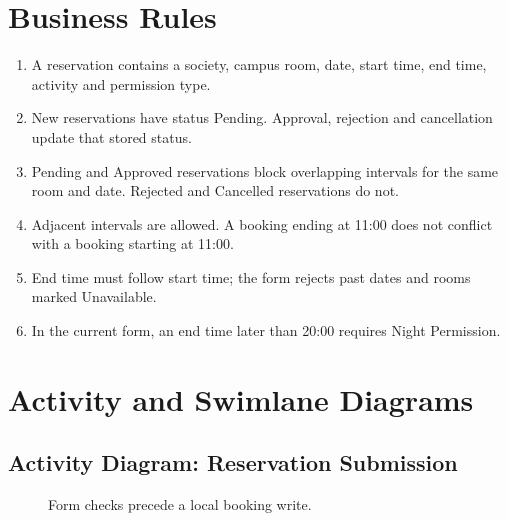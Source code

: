 \documentclass[11pt,a4paper]{report}
\begin{document}
\section{Business Rules}
\begin{enumerate}
\item A reservation contains a society, campus room, date, start time, end time, activity and permission type.
\item New reservations have status Pending. Approval, rejection and cancellation update that stored status.
\item Pending and Approved reservations block overlapping intervals for the same room and date. Rejected and Cancelled reservations do not.
\item Adjacent intervals are allowed. A booking ending at 11:00 does not conflict with a booking starting at 11:00.
\item End time must follow start time; the form rejects past dates and rooms marked Unavailable.
\item In the current form, an end time later than 20:00 requires Night Permission.
\end{enumerate}
\clearpage
\section{Activity and Swimlane Diagrams}
\subsection{Activity Diagram: Reservation Submission}
\begin{figure}[H]\centering
{}\caption{Form checks precede a local booking write.}
\end{figure}
\end{document}
